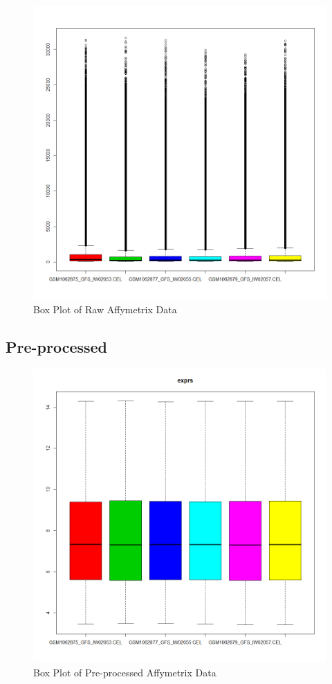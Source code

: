 \documentclass[11 pt,letterpaper]{article}
\begin{document}
    \begin{figure}[H]
        \centering
        \includegraphics[width=\linewidth]{Figures/Rplot03.png}
        \caption{Box Plot of Raw Affymetrix Data}
        \label{fig:plot1}
    \end{figure}
    \FloatBarrier

    \subsection{Pre-processed}
    \begin{figure}[H]
        \centering
        \includegraphics[width=\linewidth]{Figures/Rplot01.png}
        \caption{Box Plot of Pre-processed Affymetrix Data}
        \label{fig:plot2}
    \end{figure}
    \FloatBarrier
\end{document}
